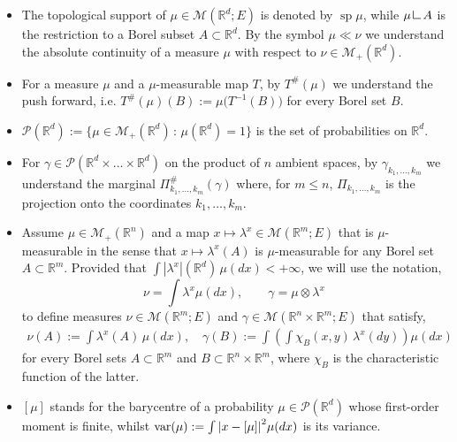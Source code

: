\documentclass[11pt,letterpaper,reqno]{amsart}
\theoremstyle{definition}
\numberwithin{equation}{section}
\newcommand{\R}{\mathbb{R}}
\newcommand{\Rd}{\R^d}
\newcommand{\var}{{\rm{var}}}
\newcommand \res{\mathop{\hbox{\vrule height 7pt width .5pt depth 0pt
			\vrule height .5pt width 6pt depth 0pt}}\nolimits}
\newcommand{\Mes}{{\mathcal{M}}}
\newcommand{\PP}{\mathcal{P}}
\newcommand{\abs}[1]{{\left \lvert #1 \right \rvert}}
\DeclareMathOperator{\spt}{sp}
\begin{document}
\begin{itemize}[leftmargin=1.2\parindent]
 \item The topological support of $\mu \in \Mes(\Rd;E)$ is denoted  by $\spt\mu$, 
 while $\mu\res A$ is the  restriction to a Borel subset $A\subset \Rd$. By the symbol $\mu \ll \nu$ we understand the absolute continuity of a measure $\mu$ with respect to $\nu \in \Mes_+(\Rd)$.



\item For a measure $\mu$ and a $\mu$-measurable map $T$, by  $T^\#(\mu)$ we understand the push forward, i.e.  $T^\#(\mu)(B) := \mu\big( T^{-1}(B) \big)$ for every Borel set $B$.

 \item  $\PP(\Rd):=\{ \mu \in \Mes_+(\Rd)\, :\, \mu(\Rd)=1\}$ is the set of probabilities on $\Rd$.


\item For $\gamma \in \PP(\Rd \times \ldots \times \Rd)$ on the product of $n$ ambient spaces, by $\gamma_{k_1,\ldots,k_m}$ we understand the marginal $\Pi_{k_1,\ldots,k_m}^\#(\gamma)$ where, for $m\leq n$,  $\Pi_{k_1,\ldots,k_m}$ is the projection onto the coordinates ${k_1,\ldots,k_m}$.





\item Assume $\mu\in \Mes_+(\R^n)$ and a map $x \mapsto \lambda^x \in \Mes(\R^m;E)$ that is $\mu$-measurable in the sense that $x \mapsto \lambda^x(A)$ is $\mu$-measurable for any Borel set $A \subset \R^m$. Provided that $\int \abs{\lambda^x}(\Rd) \,\mu(dx) < +\infty $, we will use the notation,
\begin{equation}
	\label{eq:convention}
	 \nu = \int  \lambda^x \mu(dx), \qquad \gamma= \mu \otimes \lambda^x
\end{equation}
to define measures $\nu \in \Mes(\R^m;E)$ and $\gamma \in \Mes(\R^n \times \R^m;E)$  that satisfy,
\begin{align*}
	\nu(A) := \int \lambda^x(A)\, \mu(dx), \quad \gamma(B):= \int  \left(  \int  \chi_{B}(x,y)\,\lambda^x(dy) \right) \mu(dx)
\end{align*}
for every Borel sets $A \subset \R^m$ and $B \subset \R^n \times \R^m$, where $\chi_B$ is the characteristic function of the latter.

 \item $[\mu]$ stands for the barycentre of a probability $\mu\in \PP(\Rd)$ whose first-order moment is finite, whilst $\var(\mu):= \int \abs{x-[\mu]}^2 \mu(dx)$ is its variance.




\end{itemize}
\end{document}
